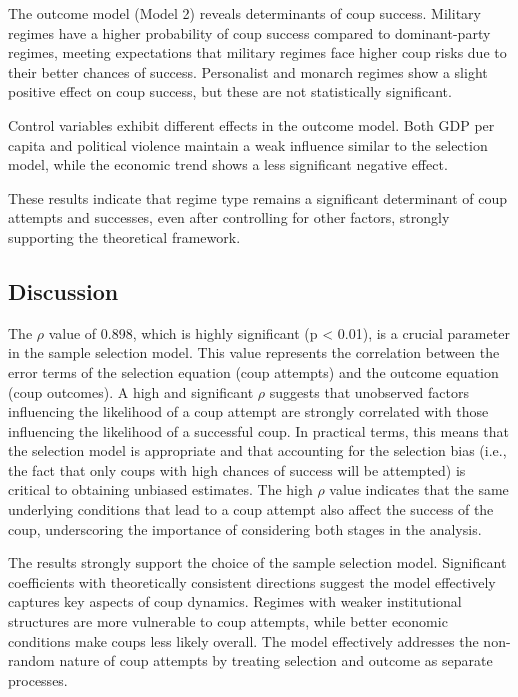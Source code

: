 \documentclass[
  12pt,
]{report}
\begin{document}
The outcome model (Model 2) reveals determinants of coup success.
Military regimes have a higher probability of coup success compared to
dominant-party regimes, meeting expectations that military regimes face
higher coup risks due to their better chances of success. Personalist
and monarch regimes show a slight positive effect on coup success, but
these are not statistically significant.

Control variables exhibit different effects in the outcome model. Both
GDP per capita and political violence maintain a weak influence similar
to the selection model, while the economic trend shows a less
significant negative effect.

These results indicate that regime type remains a significant
determinant of coup attempts and successes, even after controlling for
other factors, strongly supporting the theoretical framework.

\subsection{Discussion}\label{discussion}

The \(\rho\) value of 0.898, which is highly significant (p \textless{}
0.01), is a crucial parameter in the sample selection model. This value
represents the correlation between the error terms of the selection
equation (coup attempts) and the outcome equation (coup outcomes). A
high and significant \(\rho\) suggests that unobserved factors
influencing the likelihood of a coup attempt are strongly correlated
with those influencing the likelihood of a successful coup. In practical
terms, this means that the selection model is appropriate and that
accounting for the selection bias (i.e., the fact that only coups with
high chances of success will be attempted) is critical to obtaining
unbiased estimates. The high \(\rho\) value indicates that the same
underlying conditions that lead to a coup attempt also affect the
success of the coup, underscoring the importance of considering both
stages in the analysis.

The results strongly support the choice of the sample selection model.
Significant coefficients with theoretically consistent directions
suggest the model effectively captures key aspects of coup dynamics.
Regimes with weaker institutional structures are more vulnerable to coup
attempts, while better economic conditions make coups less likely
overall. The model effectively addresses the non-random nature of coup
attempts by treating selection and outcome as separate processes.
\end{document}
